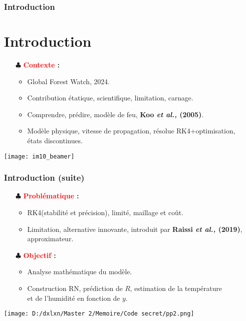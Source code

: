 \documentclass[handout]{beamer}
\newtheorem{pbm et hypo}[thm]{Problématique et hypothèses}
\begin{document}
	
	\begin{frame}
		\frametitle{Introduction}
		\section{Introduction}
		\begin{itemize}
			\item[$\clubsuit$] \textbf{\textcolor{red}{Contexte} : } \pause
			\begin{itemize}
				\item Global Forest Watch, 2024.  \pause
				\item Contribution étatique, scientifique, limitation, carnage. \pause
				\item Comprendre, prédire, modèle de feu, \textbf{Koo \textit{et al., }(2005)}. \pause
				\item Modèle physique, vitesse de propagation, résolue RK4+optimisation, états discontinues.  
			\end{itemize}
		\end{itemize}
		\pause[4]
		\begin{center}
			\texttt{[image: im10\_beamer]}
		\end{center}
	\end{frame}
	\begin{frame}
		\frametitle{Introduction (suite)}
		\begin{itemize}
			\item[$\clubsuit$] \textbf{\textcolor{red}{Problématique} : } \pause
			\begin{itemize}
				\item RK4(stabilité et précision), limité, maillage et coût. \pause
				\item Limitation, alternative innovante, introduit par \textbf{Raissi \textit{et al.,} (2019)}, approximateur. \pause
			\end{itemize}
		\end{itemize}
		\begin{itemize}
			\item[$\clubsuit$] \textbf{\textcolor{red}{Objectif} : } \pause
			\begin{itemize}
				\item Analyse mathématique du modèle. \pause
				\item Construction RN, prédiction de $R$, estimation de la température \\ et de l'humidité en fonction de $y$.
			\end{itemize}
		\end{itemize}
	\end{frame}
	\begin{frame}[plain]
		\noindent
		\texttt{[image: D:/dxlxn/Master 2/Memoire/Code secret/pp2.png]}
	\end{frame}
	
\end{document}
